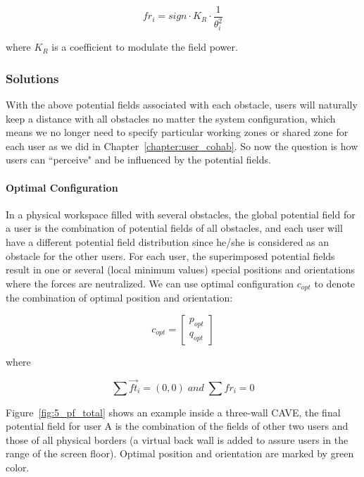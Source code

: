 \begin{equation}
{fr}_{i}=sign \cdot K_{R} \cdot \frac{1}{\theta_{i}^2}
\end{equation}

where $K_{R}$ is a coefficient to modulate the field power.

\subsubsection{Solutions}
With the above potential fields associated with each obstacle, users will naturally keep a distance with all obstacles no matter the system configuration, which means we no longer need to specify particular working zones or shared zone for each user as we did in Chapter~\ref{chapter:user_cohab}. So now the question is how users can ``perceive" and be influenced by the potential fields.

\paragraph{Optimal Configuration} In a physical workspace filled with several obstacles, the global potential field for a user is the combination of potential fields of all obstacles, and each user will have a different potential field distribution since he/she is considered as an obstacle for the other users. For each user, the superimposed potential fields result in one or several (local minimum values) special positions and orientations where the forces are neutralized. We can use optimal configuration $c_{opt}$ to denote the combination of optimal position and orientation:

\begin{equation}
c_{opt}=
\begin{bmatrix}
p_{opt} \\ q_{opt}
\end{bmatrix}
\end{equation}

where

\begin{equation}
\sum \overrightarrow{ft}_{i}=(0, 0)\; and\; \sum fr_{i}=0
\end{equation}


Figure~\ref{fig:5_pf_total} shows an example inside a three-wall CAVE, the final potential field for user A is the combination of the fields of other two users and those of all physical borders (a virtual back wall is added to assure users in the range of the screen floor). Optimal position and orientation are marked by green color.


